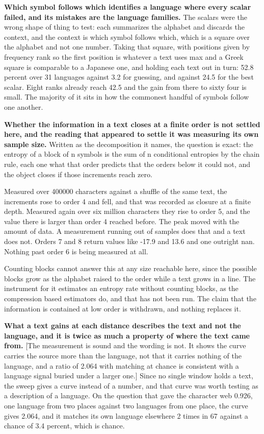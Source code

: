 \textbf{Which symbol follows which identifies a language where every scalar failed, and its mistakes are the language families.} The scalars were the wrong shape of thing to test: each summarizes the alphabet and discards the context, and the context is which symbol follows which, which is a square over the alphabet and not one number. Taking that square, with positions given by frequency rank so the first position is whatever a text uses max and a Greek square is comparable to a Japanese one, and holding each text out in turn: 52.8 percent over 31 languages against 3.2 for guessing, and against 24.5 for the best scalar. Eight ranks already reach 42.5 and the gain from there to sixty four is small. The majority of it sits in how the commonest handful of symbols follow one another.

\textbf{Whether the information in a text closes at a finite order is not settled here, and the reading that appeared to settle it was measuring its own sample size.} Written as the decomposition it names, the question is exact: the entropy of a block of n symbols is the sum of n conditional entropies by the chain rule, each one what that order predicts that the orders below it could not, and the object closes if those increments reach zero.

Measured over 400000 characters against a shuffle of the same text, the increments rose to order 4 and fell, and that was recorded as closure at a finite depth. Measured again over six million characters they rise to order 5, and the value there is larger than order 4 reached before. The peak moved with the amount of data. A measurement running out of samples does that and a text does not. Orders 7 and 8 return values like -17.9 and 13.6 and one outright nan. Nothing past order 6 is being measured at all.

Counting blocks cannot answer this at any size reachable here, since the possible blocks grow as the alphabet raised to the order while a text grows in a line. The instrument for it estimates an entropy rate without counting blocks, as the compression based estimators do, and that has not been run. The claim that the information is contained at low order is withdrawn, and nothing replaces it.

\textbf{What a text gains at each distance describes the text and not the language, and it is twice as much a property of where the text came from.} [The measurement is sound and the wording is not. It shows the curve carries the source more than the language, not that it carries nothing of the language, and a ratio of 2.064 with matching at chance is consistent with a language signal buried under a larger one.] Since no single window holds a text, the sweep gives a curve instead of a number, and that curve was worth testing as a description of a language. On the question that gave the character web 0.926, one language from two places against two languages from one place, the curve gives 2.064, and it matches its own language elsewhere 2 times in 67 against a chance of 3.4 percent, which is chance.

